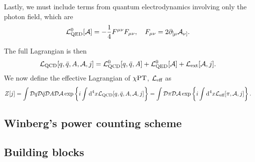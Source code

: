 
Lastly, we must include terms from quantum electrodynamics involving only the photon field, which are
%
\begin{equation}
    \mathcal{L}^0_\text{QED}[\mathcal A] 
    = -\frac{1}{4} F^{\mu \nu}F_{\mu \nu}, \quad
    F_{\mu \nu} = 2 \partial_{[\mu}\mathcal A_{\nu]}.
\end{equation}
 

The full Lagrangian is then
%
\begin{equation}
    \mathcal{L}_\text{QCD}[q, \bar q, A,\mathcal A, j] = \mathcal{L}_\text{QCD}^0[q, \bar q, A] + \mathcal{L}^0_\text{QED}[\mathcal A] + \mathcal{L}_\text{ext}[\mathcal A, j].
\end{equation}
%
We now define the effective Lagrangian of $\chi \text{PT}$, $\mathcal{L}_\text{eff}$ as
%
\begin{equation}
    \label{definition effective lagrangian chpt}
    Z[j]
    = 
    \int \mathcal D q \mathcal D \bar q \mathcal D A \mathcal D \mathcal A\,
    \text{exp} \left\{ i\int \text{d}^4 x \mathcal{L}_\text{QCD}[q, \bar q, A, \mathcal A, j]  \right\}
    = 
    \int \mathcal D \pi \mathcal D \mathcal A\,
    \text{exp} \left\{ i\int \text{d}^4 x \mathcal{L}_\text{eff}[\pi, \mathcal{A}, j]  \right\}.
\end{equation}


\subsection{Winberg's power counting scheme}



\subsection{Building blocks}

